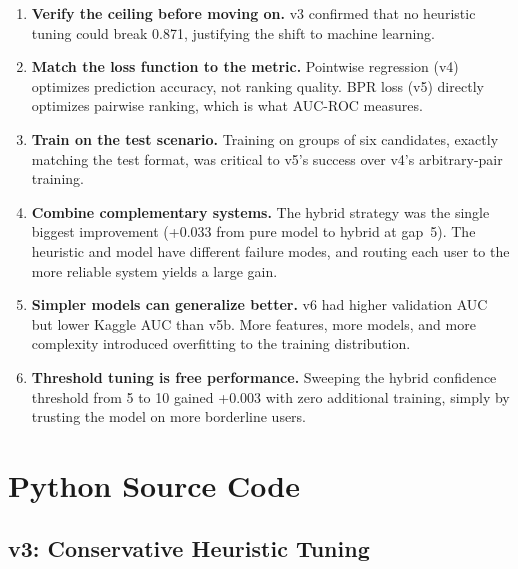 \documentclass[12pt]{article}
\begin{document}
\begin{enumerate}
	\item \textbf{Verify the ceiling before moving on.} v3 confirmed that no heuristic tuning could break 0.871, justifying the shift to machine learning.

	\item \textbf{Match the loss function to the metric.} Pointwise regression (v4) optimizes prediction accuracy, not ranking quality. BPR loss (v5) directly optimizes pairwise ranking, which is what AUC-ROC measures.

	\item \textbf{Train on the test scenario.} Training on groups of six candidates, exactly matching the test format, was critical to v5's success over v4's arbitrary-pair training.

	\item \textbf{Combine complementary systems.} The hybrid strategy was the single biggest improvement (+0.033 from pure model to hybrid at gap~5). The heuristic and model have different failure modes, and routing each user to the more reliable system yields a large gain.

	\item \textbf{Simpler models can generalize better.} v6 had higher validation AUC but lower Kaggle AUC than v5b. More features, more models, and more complexity introduced overfitting to the training distribution.

	\item \textbf{Threshold tuning is free performance.} Sweeping the hybrid confidence threshold from 5 to 10 gained +0.003 with zero additional training, simply by trusting the model on more borderline users.
\end{enumerate}

\newpage
\appendix
\section{Python Source Code}\label{app:code}

\subsection{v3: Conservative Heuristic Tuning}


\end{document}
